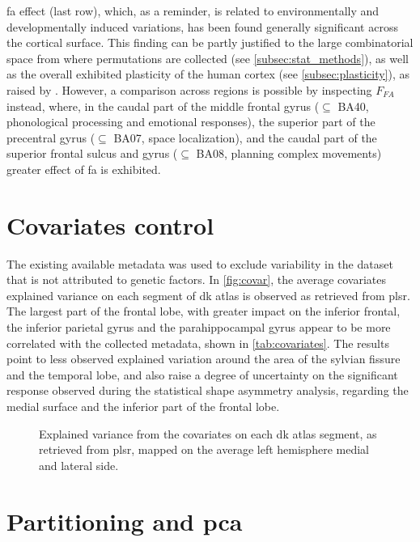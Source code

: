 \Ac{fa} effect (last row), which, as a reminder, is related to environmentally and developmentally induced variations, has been found generally significant across the cortical surface. This finding can be partly justified to the large combinatorial space from where permutations are collected (see \autoref{subsec:stat_methods}), as well as the overall exhibited plasticity of the human cortex (see \autoref{subsec:plasticity}), as raised by \citet{Vanbiervliet2022}. However, a comparison across regions is possible by inspecting  $F_{FA}$ instead, where, in the caudal part of the middle frontal gyrus ($\subseteq$ BA40, phonological processing and emotional responses), the superior part of the precentral gyrus ($\subseteq$ BA07, space localization), and the caudal part of the superior frontal sulcus and gyrus ($\subseteq$ BA08, planning complex movements) greater effect of \ac{fa} is exhibited.


\section{Covariates control}
The existing available metadata was used to exclude variability in the dataset that is not attributed to genetic factors. In \autoref{fig:covar}, the average covariates explained variance on each segment of \ac{dk} atlas is observed as retrieved from \ac{plsr}. The largest part of the frontal lobe, with greater impact on the inferior frontal, the inferior parietal gyrus and the parahippocampal gyrus appear to be more correlated with the collected metadata, shown in \autoref{tab:covariates}. The results point to less observed explained variation around the area of the sylvian fissure and the temporal lobe, and also raise a degree of uncertainty on the significant response observed during the statistical shape asymmetry analysis, regarding the medial surface and the inferior part of the frontal lobe.
\begin{figure}[H]

\caption[Explained variance from covariates]{Explained variance from the covariates on each \ac{dk} atlas segment, as retrieved from \ac{plsr}, mapped on the average left hemisphere medial and lateral side.}
\label{fig:covar}
\end{figure}
\section{Partitioning and \acs{pca}}

